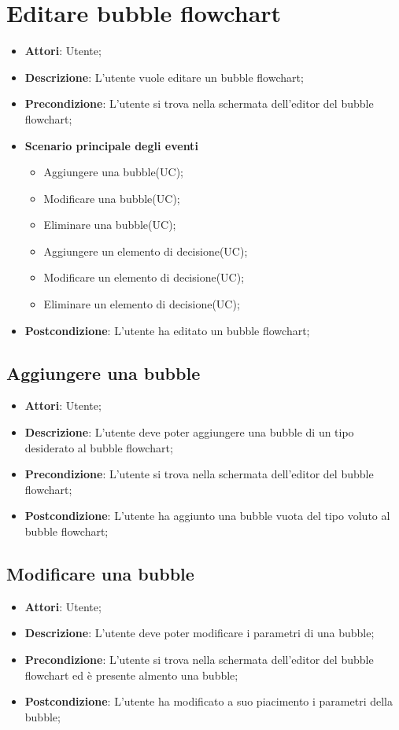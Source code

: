 \documentclass[../AnalisiDeiRequisiti.tex]{subfiles}
\begin{document}
	\section{Editare bubble flowchart}
	\begin{itemize}
		\item \textbf{Attori}: Utente;
		\item \textbf{Descrizione}: L'utente vuole editare un bubble flowchart;
		\item \textbf{Precondizione}: L'utente si trova nella schermata dell'editor del bubble flowchart;
		\item \textbf{Scenario principale degli eventi}
		\begin{itemize}
			\item Aggiungere una bubble(UC);
			\item Modificare una bubble(UC);
			\item Eliminare una bubble(UC);
			\item Aggiungere un elemento di decisione(UC);
			\item Modificare un elemento di decisione(UC);
			\item Eliminare un elemento di decisione(UC);
		\end{itemize}
		\item \textbf{Postcondizione}: L'utente ha editato un bubble flowchart;
	\end{itemize}
	
	\subsection{Aggiungere una bubble}
	\begin{itemize}
		\item \textbf{Attori}: Utente;
		\item \textbf{Descrizione}: L'utente deve poter aggiungere una bubble di un tipo desiderato al bubble flowchart;
		\item \textbf{Precondizione}: L'utente si trova nella schermata dell'editor del bubble flowchart;
		\item \textbf{Postcondizione}: L'utente ha aggiunto una bubble vuota del tipo voluto al bubble flowchart;
	\end{itemize}
	
	\subsection{Modificare una bubble}
	\begin{itemize}
		\item \textbf{Attori}: Utente;
		\item \textbf{Descrizione}: L'utente deve poter modificare i parametri di una bubble;
		\item \textbf{Precondizione}: L'utente si trova nella schermata dell'editor del bubble flowchart ed è presente almento una bubble;
		\item \textbf{Postcondizione}: L'utente ha modificato a suo piacimento i parametri della bubble;
	\end{itemize}
	
\end{document}
